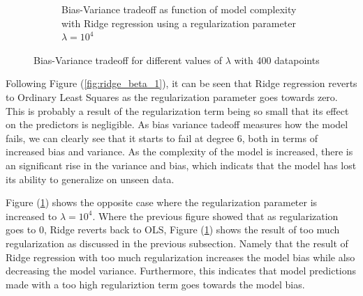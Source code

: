 \documentclass[11pt, a4paper]{article}
\begin{document}
\begin{figure}
\begin{subfigure}{0.49\textwidth}
    \caption{\label{fig:ridge_beta_2}Bias-Variance tradeoff as function of model complexity with Ridge regression using a regularization parameter $\lambda = 10^{4}$}
  \end{subfigure}
  \caption{\label{sfig:ridge_beta_1}Bias-Variance tradeoff for different values of $\lambda$ with 400 datapoints}
\end{figure}



Following Figure (\ref{fig:ridge_beta_1}), it can be seen that Ridge regression reverts to Ordinary Least Squares as the regularization parameter goes towards zero. This is probably a result of the regularization term being so small that its effect on the predictors is negligible. As bias variance tadeoff measures how the model fails, we can clearly see that it starts to fail at degree 6, both in terms of increased bias and variance. As the complexity of the model is increased, there is an significant rise in the variance and bias, which indicats that the model has lost its ability to generalize on unseen data.

Figure (\ref{fig:ridge_beta_2}) shows the opposite case where the regularization parameter is increased to $\lambda = 10^4$. Where the previous figure showed that as regularization goes to 0, Ridge reverts back to OLS, Figure (\ref{fig:ridge_beta_2}) shows the result of too much regularization as discussed in the previous subsection. Namely that the result of Ridge regression with too much regularization increases the model bias while also decreasing the model variance. Furthermore, this indicates that model predictions made with a too high regulariztion term goes towards the model bias.
\end{document}
